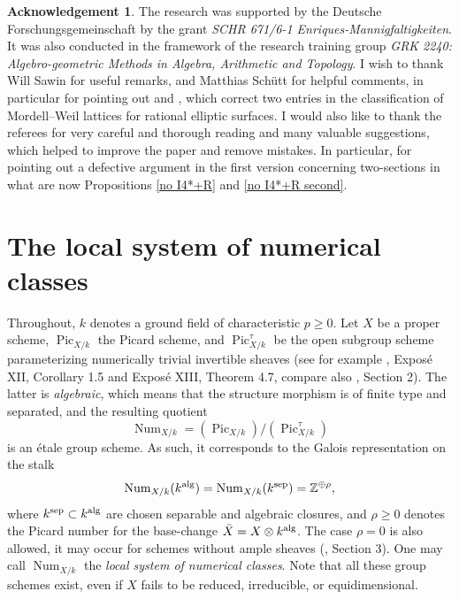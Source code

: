 \documentclass[oneside, 12pt]{amsart}
\newcommand\mylabel[1]{\label{#1}\marginpar{\vspace{-1ex}\medskip\medskip\footnotesize \tt #1}}
\renewcommand\mylabel[1]{\label{#1}}
\theoremstyle{definition}
\newtheorem*{acknowledgement}{Acknowledgement}
\theoremstyle{remark}
\newcommand{\ZZ}{\mathbb{Z}}
\newcommand{\alg}{\text{\rm alg}}
\newcommand{\Num}{\operatorname{Num}}
\newcommand{\Pic}{\operatorname{Pic}}
\newcommand{\sep}{{\operatorname{sep}}}
\newcommand{\bX}{{\bar{X}}}
\begin{document}
\begin{acknowledgement}
The research was supported by the Deutsche Forschungsgemeinschaft by the grant  \emph{SCHR 671/6-1 Enriques-Mannigfaltigkeiten}.
It was also conducted  in the framework of the   research training group
\emph{GRK 2240: Algebro-geometric Methods in Algebra, Arithmetic and Topology}.
I wish to thank Will Sawin for useful remarks, and Matthias Sch\"utt for helpful comments, in particular for 
pointing out  \cite{Shioda 1992} and \cite{Schuett; Shioda 2019},
which correct two entries in the classification of Mordell--Weil lattices for rational elliptic surfaces.
I would also like to thank the referees for very  careful and thorough reading and many valuable suggestions, which helped to improve the paper
and remove mistakes. In particular, for pointing out a defective argument in the first version concerning   two-sections in
what are  now Propositions \ref{no I4*+R} and   \ref{no I4*+R second}.
\end{acknowledgement}


\section{The local system of numerical classes}
\mylabel{Local system}

Throughout, $k$ denotes  a ground field of characteristic $p\geq 0$. Let $X$ be a proper scheme,   $\Pic_{X/k}$ the
Picard scheme, and $\Pic^\tau_{X/k}$ be the open subgroup scheme parameterizing numerically trivial
invertible sheaves  (see for example \cite{SGA 6}, Expos\'e XII, Corollary 1.5 and Expos\'e XIII, Theorem 4.7, compare also
\cite{Laurent; Schroeer 2021}, Section 2). 
The latter is   \emph{algebraic}, which means that the structure morphism is of finite type and separated,
and the resulting quotient
$$
\Num_{X/k}=(\Pic_{X/k})/(\Pic^\tau_{X/k})
$$
is an \'etale group scheme.
As such, it corresponds to the Galois representation on the stalk
$$
\Num_{X/k}(k^\alg)=\Num_{X/k}(k^\sep)=\ZZ^{\oplus\rho},
$$
where  $k^\sep\subset k^\alg$ are chosen separable and algebraic closures,
and  $\rho\geq 0$ denotes the Picard number for the base-change $\bX=X\otimes k^\alg$. 
The case $\rho=0$ is also allowed, it   may occur  for   schemes without ample sheaves (\cite{Schroeer 1999}, Section 3).
One may call  $\Num_{X/k}$  the \emph{local system  of numerical classes}.
Note that all these group schemes exist, even if $X$ fails to be reduced, irreducible,
or equidimensional.
\end{document}
